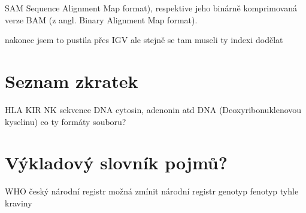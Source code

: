 \documentclass[czech,DP]{thesiskiv}
\begin{document}
SAM Sequence Alignment Map format), respektive jeho binárně
komprimovaná verze BAM (z angl. Binary Alignment Map format).

nakonec jsem to pustila přes IGV ale stejně se tam museli ty indexi dodělat

\chapter{Seznam zkratek}
HLA
KIR
NK
sekvence DNA cytosin, adenonin atd
DNA (Deoxyribonuklenovou kyselinu)
co ty formáty souboru?

\chapter{Výkladový slovník pojmů?}
WHO
český národní registr 
možná zmínit národní registr
genotyp 
fenotyp tyhle kraviny
% 
%
\nocite{*}

{\raggedright\small

}
\end{document}
